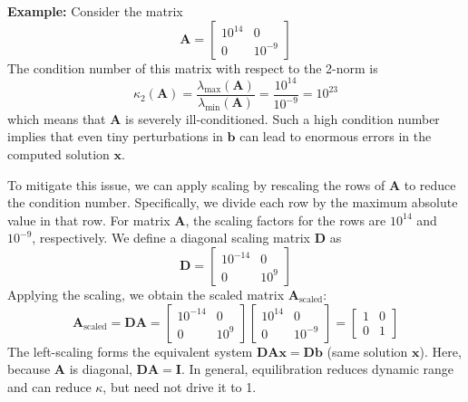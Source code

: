 \begin{exampleBox}
    \textbf{Example:} Consider the matrix
    \begin{equation*}
        \mathbf{A} = \begin{bmatrix}
        10^{14} & 0 \\
        0 & 10^{-9}
        \end{bmatrix}
    \end{equation*}
    The condition number of this matrix with respect to the 2-norm is
    \begin{equation*}
        \kappa_2(\mathbf{A}) = \frac{\lambda_{\text{max}}(\mathbf{A})}{\lambda_{\text{min}}(\mathbf{A})} = \frac{10^{14}}{10^{-9}} = 10^{23}
    \end{equation*}
    which means that $\mathbf{A}$ is severely ill-conditioned. Such a high condition number implies that even tiny perturbations in $\mathbf{b}$ can lead to enormous errors in the computed solution $\mathbf{x}$.

    To mitigate this issue, we can apply scaling by rescaling the rows of $\mathbf{A}$ to reduce the condition number. Specifically, we divide each row by the maximum absolute value in that row. For matrix $\mathbf{A}$, the scaling factors for the rows are $10^{14}$ and $10^{-9}$, respectively. We define a diagonal scaling matrix $\mathbf{D}$ as
    \begin{equation*}
    \mathbf{D} = \begin{bmatrix}
    10^{-14} & 0 \\
    0 & 10^{9}
    \end{bmatrix}
    \end{equation*}
    Applying the scaling, we obtain the scaled matrix $\mathbf{A}_{\text{scaled}}$:
    \begin{equation*}
    \mathbf{A}_{\text{scaled}} = \mathbf{D} \mathbf{A} = \begin{bmatrix}
    10^{-14} & 0 \\
    0 & 10^{9}
    \end{bmatrix} \begin{bmatrix}
    10^{14} & 0 \\
    0 & 10^{-9}
    \end{bmatrix} = \begin{bmatrix}
    1 & 0 \\
    0 & 1
    \end{bmatrix}
    \end{equation*}
    The left-scaling forms the equivalent system $\mathbf{D}\mathbf{A}\mathbf{x} = \mathbf{D}\mathbf{b}$ (same solution $\mathbf{x}$). Here, because $\mathbf{A}$ is diagonal, $\mathbf{D}\mathbf{A} = \mathbf{I}$. In general, equilibration reduces dynamic range and can reduce $\kappa$, but need not drive it to 1.


\end{exampleBox}
